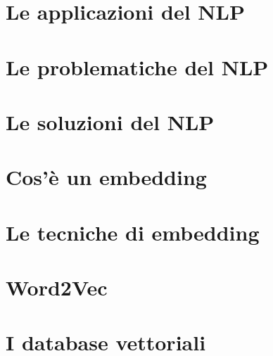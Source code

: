 \section{Le applicazioni del NLP}

\section{Le problematiche del NLP}

\section{Le soluzioni del NLP}

\section{Cos'è un embedding}

\section{Le tecniche di embedding}

\section{Word2Vec}

\section{I database vettoriali}